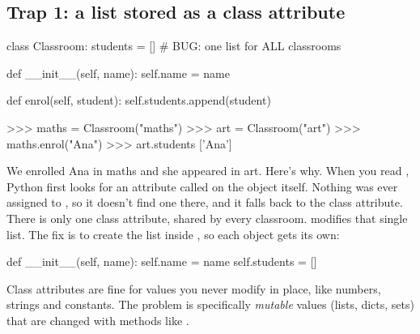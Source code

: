 \documentclass[10pt,a4paper]{article}
\begin{document}
\subsection{Trap 1: a list stored as a class attribute}
\begin{pycode}
class Classroom:
    students = []                 # BUG: one list for ALL classrooms

    def __init__(self, name):
        self.name = name

    def enrol(self, student):
        self.students.append(student)
\end{pycode}
\begin{txtcode}
>>> maths = Classroom("maths")
>>> art = Classroom("art")
>>> maths.enrol("Ana")
>>> art.students
['Ana']
\end{txtcode}
We enrolled Ana in maths and she appeared in art.
Here’s why. When you read , Python first looks for an attribute called  on the object itself. Nothing was ever assigned to , so it doesn’t find one there, and it falls back to the class attribute. There is only one class attribute, shared by every classroom.  modifies that single list.
The fix is to create the list inside , so each object gets its own:
\begin{pycode}
    def __init__(self, name):
        self.name = name
        self.students = []
\end{pycode}
Class attributes are fine for values you never modify in place, like numbers, strings and constants. The problem is specifically \emph{mutable} values (lists, dicts, sets) that are changed with methods like .
\end{document}
